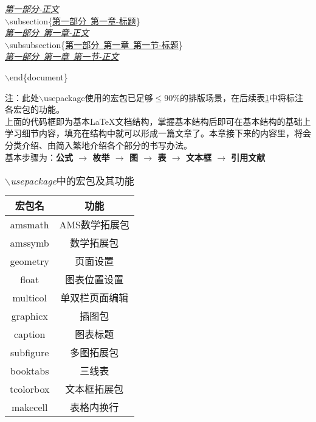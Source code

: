 \documentclass{article}
\begin{document}
\begin{center}
{\begin{minipage}{14.6cm}
{\begin{minipage}{14cm}
								\hspace*{18pt}\underline{\textit{第一部分-正文}} \\
								\hspace*{18pt}$\backslash$subsection\{\underline{第一部分\ 第一章-标题}\} \\
								\hspace*{32pt}\underline{\textit{第一部分\ 第一章-正文}} \\
								\hspace*{32pt}$\backslash$subsubsection\{\underline{第一部分\ 第一章\ 第一节-标题}\} \\
								\hspace*{46pt}\underline{\textit{第一部分\ 第一章\ 第一节-正文}}
						\end{minipage}}
					
						$\backslash$end\{document\} 
					\end{minipage}}
			\end{center}
			{\small *注：此处$\backslash$usepackage使用的宏包已足够$\le$90\%的排版场景，在后续表\ref{table3}中将标注各宏包的功能。} \\
			上面的代码框即为基本\LaTeX 文档结构，掌握基本结构后即可在基本结构的基础上学习细节内容，填充在结构中就可以形成一篇文章了。本章接下来的内容里，将会分类介绍、由简入繁地介绍各个部分的书写办法。 \\
			基本步骤为：\textbf{公式 $\to$ 枚举 $\to$ 图 $\to$ 表 $\to$ 文本框 $\to$ 引用文献} 
			\begin{table}[H]
				\centering
				\caption{\textit{$\backslash$usepackage}中的宏包及其功能}
				\setlength{\tabcolsep}{50pt}
				\begin{tabular}{c|c}
					\toprule
						\textbf{宏包名} & \textbf{功能} \\
					\midrule
						amsmath & AMS数学拓展包 \\
						amssymb & 数学拓展包 \\
					\midrule
						geometry & 页面设置 \\
						float & 图表位置设置 \\
						multicol & 单双栏页面编辑 \\
					\midrule
						graphicx & 插图包 \\
						caption & 图表标题 \\
						subfigure & 多图拓展包 \\
						booktabs & 三线表 \\
						tcolorbox & 文本框拓展包 \\
						makecell & 表格内换行 \\
					\bottomrule
				\end{tabular}
				\label{table3}
			\end{table}
			
\end{document}
